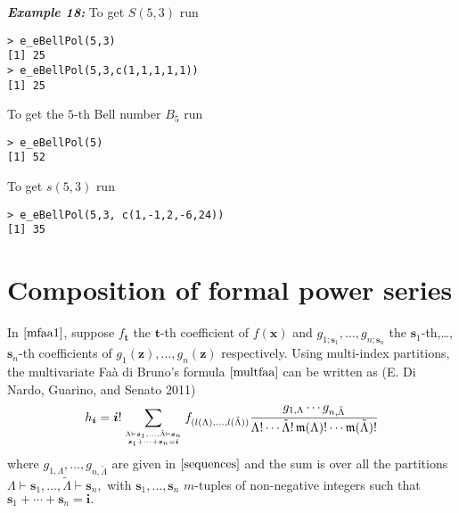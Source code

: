 \hskip-0.5cm\textbf{\emph{Example 18:}} To get \(S(5,3)\) run

\begin{verbatim}
> e_eBellPol(5,3)
[1] 25
> e_eBellPol(5,3,c(1,1,1,1,1))
[1] 25
\end{verbatim}

\noindent To get the \(5\)-th Bell number \(B_5\) run

\begin{verbatim}
> e_eBellPol(5)
[1] 52
\end{verbatim}

\noindent To get \(s(5,3)\) run

\begin{verbatim}
> e_eBellPol(5,3, c(1,-1,2,-6,24))
[1] 35
\end{verbatim}

\hypertarget{composition-of-formal-power-series}{%
\section{Composition of formal power series}\label{composition-of-formal-power-series}}

In \(\eqref{mfaa1}\), suppose \(f_{\boldsymbol{t}}\) the \(\boldsymbol{t}\)-th coefficient of \(f(\boldsymbol{x})\) and \(g_{1; \boldsymbol{s}_1}, \ldots, g_{n; \boldsymbol{s}_n}\) the \(\boldsymbol{s}_1\)-th,\ldots,\(\boldsymbol{s}_n\)-th coefficients of \(g_1(\boldsymbol{z}), \ldots, g_n(\boldsymbol{z})\) respectively. Using multi-index partitions, the multivariate Faà di Bruno's formula \(\eqref{multfaa}\) can be written as (E. Di Nardo, Guarino, and Senato 2011)
\begin{equation}\label{multfaa2}
h_{\boldsymbol{i}} = \boldsymbol{i}! \sum_{{\Lambda} \vdash \boldsymbol{s}_1, \ldots, \tilde{\Lambda} \vdash  \boldsymbol{s}_n \atop \boldsymbol{s}_1 + \cdots + \boldsymbol{s}_n = \boldsymbol{i}} f_{(l(\Lambda),\ldots,l(\tilde{\Lambda}))} \frac{g_{1, \Lambda} \cdots g_{n, \tilde{\Lambda}}}{\Lambda!
\cdots \tilde{\Lambda}! \, \mathfrak{m}(\Lambda)! \cdots \mathfrak{m}(\tilde{\Lambda})!}
\end{equation}
where \(g_{1,\Lambda}, \ldots, g_{n,\tilde{\Lambda}}\) are given in \(\eqref{sequences}\)
and the sum is over all the partitions \({\Lambda} \vdash \boldsymbol{s}_1, \ldots, \tilde{\Lambda} \vdash \boldsymbol{s}_n,\) with \(\boldsymbol{s}_1,\ldots,\boldsymbol{s}_n\) \(m\)-tuples of non-negative integers such that \(\boldsymbol{s}_1 + \cdots + \boldsymbol{s}_n = \boldsymbol{i}.\)

